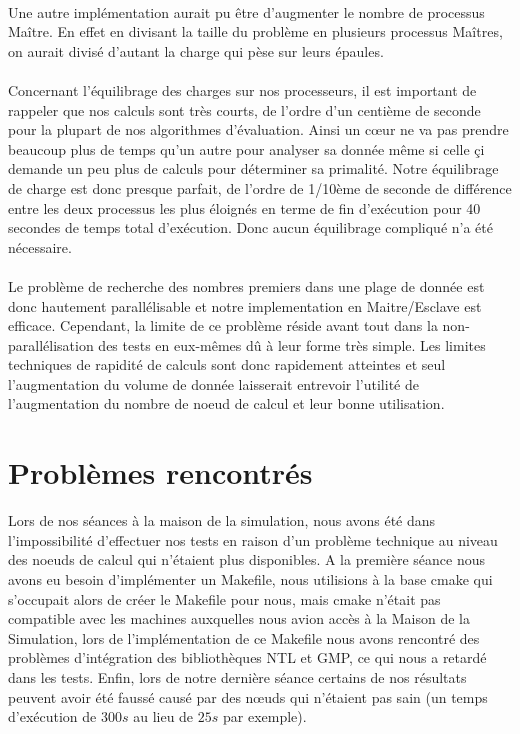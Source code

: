 \paragraph{}Une autre implémentation aurait pu être d'augmenter le nombre de processus Maître. En effet en divisant la taille du problème en plusieurs processus Maîtres, on aurait divisé d'autant la charge qui pèse sur leurs épaules.

\paragraph{}Concernant l'équilibrage des charges sur nos processeurs, il est important de rappeler que nos calculs sont très courts, de l'ordre d'un centième de seconde pour la plupart de nos algorithmes d'évaluation.
Ainsi un cœur ne va pas prendre beaucoup plus de temps qu'un autre pour analyser sa donnée même si celle çi demande un peu plus de calculs pour déterminer sa primalité.
Notre équilibrage de charge est donc presque parfait, de l'ordre de 1/10ème de seconde de différence entre les deux processus les plus éloignés en terme de fin d’exécution pour 40 secondes de temps total d’exécution. Donc aucun équilibrage compliqué n'a été nécessaire.

\paragraph{}Le problème de recherche des nombres premiers dans une plage de donnée est donc hautement parallélisable et notre implementation en Maitre/Esclave est efficace. Cependant, la limite de ce problème réside avant tout dans la non-parallélisation des tests en eux-mêmes dû à leur forme très simple.
Les limites techniques de rapidité de calculs sont donc rapidement atteintes et seul l'augmentation du volume de donnée laisserait entrevoir l'utilité de l'augmentation du nombre de noeud de calcul et leur bonne utilisation.		
		
	\section{Problèmes rencontrés}
	Lors de nos séances à la maison de la simulation, nous avons été dans l'impossibilité d'effectuer nos tests en raison d'un problème technique au niveau des noeuds de calcul qui n'étaient plus disponibles.
	A la première séance nous avons eu besoin d'implémenter un Makefile, nous utilisions à la base cmake qui s'occupait alors de créer le Makefile pour nous, mais cmake n'était pas compatible avec les machines auxquelles nous avion accès à la Maison de la Simulation, lors de l'implémentation de ce Makefile nous avons rencontré des problèmes d'intégration des bibliothèques NTL et GMP, ce qui nous a retardé dans les tests.
	Enfin, lors de notre dernière séance certains de nos résultats peuvent avoir été faussé causé par des nœuds qui n'étaient pas sain (un temps d'exécution de $300s$ au lieu de $25s$ par exemple).
					
